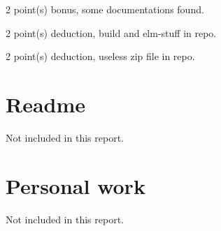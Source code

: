 \documentclass{article}
\begin{document}
\inputminted[firstline=25,lastline=48]{elm}{Collision.elm}

2 point(s) {\color{red}bonus}, some documentations found.\medskip

2 point(s) {\color{red}deduction}, build and elm-stuff in repo.\medskip

2 point(s) {\color{red}deduction}, useless zip file in repo.\medskip



\newpage

\section{Readme}

Not included in this report.

\section{Personal work}

Not included in this report.


\newpage
\end{document}
